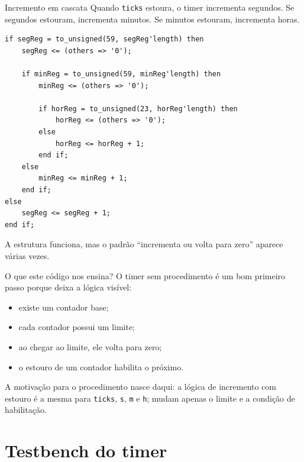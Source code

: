 \documentclass[aspectratio=169,11pt]{beamer}
\begin{document}
\begin{frame}[fragile]{Incremento em cascata}
    Quando \texttt{ticks} estoura, o timer incrementa segundos. Se segundos estouram, incrementa minutos. Se minutos estouram, incrementa horas.

\begin{lstlisting}
if segReg = to_unsigned(59, segReg'length) then
    segReg <= (others => '0');

    if minReg = to_unsigned(59, minReg'length) then
        minReg <= (others => '0');

        if horReg = to_unsigned(23, horReg'length) then
            horReg <= (others => '0');
        else
            horReg <= horReg + 1;
        end if;
    else
        minReg <= minReg + 1;
    end if;
else
    segReg <= segReg + 1;
end if;
\end{lstlisting}

    \vspace{0.4em}
    A estrutura funciona, mas o padrão ``incrementa ou volta para zero'' aparece várias vezes.
\end{frame}

\begin{frame}{O que este código nos ensina?}
    O timer sem procedimento é um bom primeiro passo porque deixa a lógica visível:
    \begin{itemize}
        \item existe um contador base;
        \item cada contador possui um limite;
        \item ao chegar ao limite, ele volta para zero;
        \item o estouro de um contador habilita o próximo.
    \end{itemize}

    \vspace{0.5em}
    A motivação para o procedimento nasce daqui: a lógica de incremento com estouro é a mesma para \texttt{ticks}, \texttt{s}, \texttt{m} e \texttt{h}; mudam apenas o limite e a condição de habilitação.

\end{frame}


\section{Testbench do timer}
\end{document}
